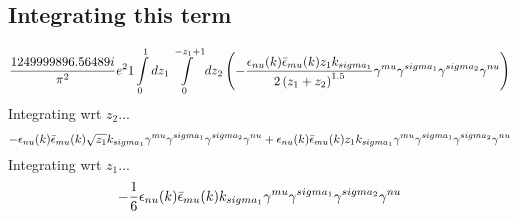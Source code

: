 \subsection*{Integrating this term}
\begin{dmath}\frac{1249999896.56489 i}{\pi^{2}} e^{2}1\int\limits_{ 0 }^{ 1 } d{ z_{ 1 } }\int\limits_{ 0 }^{ - { z_{ 1 } } + 1 } d{ z_{ 2 } }\left(- \frac{\epsilon_{ \\nu }({ k }) \bar{\epsilon}_{ \\mu }({ k }) { z_{ 1 } } { { k }_{ \\sigma_1 } }}{2 \left({ z_{ 1 } } + { z_{ 2 } }\right)^{1.5}} { \gamma^{ \\mu } } { \gamma^{ \\sigma_1 } } { \gamma^{ \\sigma_2 } } { \gamma^{ \\nu } }\right)\end{dmath}
Integrating wrt ${ z_{ 2 } }$...
\begin{dmath}- \epsilon_{ \\nu }({ k }) \bar{\epsilon}_{ \\mu }({ k }) \sqrt{{ z_{ 1 } }} { { k }_{ \\sigma_1 } } { \gamma^{ \\mu } } { \gamma^{ \\sigma_1 } } { \gamma^{ \\sigma_2 } } { \gamma^{ \\nu } } + \epsilon_{ \\nu }({ k }) \bar{\epsilon}_{ \\mu }({ k }) { z_{ 1 } } { { k }_{ \\sigma_1 } } { \gamma^{ \\mu } } { \gamma^{ \\sigma_1 } } { \gamma^{ \\sigma_2 } } { \gamma^{ \\nu } }\end{dmath}
Integrating wrt ${ z_{ 1 } }$...
\begin{dmath}- \frac{1}{6} \epsilon_{ \\nu }({ k }) \bar{\epsilon}_{ \\mu }({ k }) { { k }_{ \\sigma_1 } } { \gamma^{ \\mu } } { \gamma^{ \\sigma_1 } } { \gamma^{ \\sigma_2 } } { \gamma^{ \\nu } }\end{dmath}
